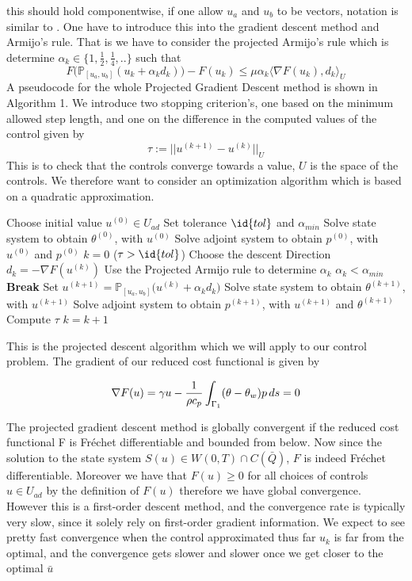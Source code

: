 this should hold componentwise, if one allow $u_a$ and $u_b$ to be vectors, notation is similar to \cite{Algorithms}. One have to introduce this into the gradient descent method and Armijo's rule. That is we have to consider the projected Armijo's rule which is determine $\alpha_k \in \{1, \frac{1}{2},\frac{1}{4},.. \}$ such that 
\begin{equation*}
    F \bigg (\mathbb{P}_{[u_a,u_b]}(u_k + \alpha_kd_k) \bigg ) - F(u_k) \leq \mu \alpha_k \langle \nabla F(u_k),d_k \rangle_{U}
\end{equation*}
A pseudocode for the whole Projected Gradient Descent method is shown in Algorithm 1. We introduce two stopping criterion's, one based on the minimum allowed step length, and one on the difference in the computed values of the control given by 
\begin{equation}
    \label{eq:stopping}
    \tau := ||u^{(k+1)} - u^{(k)}||_U 
\end{equation}
This is to check that the controls converge towards a value, $U$ is the space of the controls. We therefore want to consider an optimization algorithm which is based on a quadratic approximation. 

\begin{codebox}
\li Choose initial value $u^{(0)}\in U_{ad}$
\li Set tolerance $\id{tol}$ and $\alpha_{min}$
\li Solve state system to obtain $\theta^{(0)}$, with $u^{(0)}$
\li Solve adjoint system to obtain $p^{(0)}$, with $u^{(0)}$ and $p^{(0)}$
\li $k=0$
\li \While ($\tau > \id{tol}$)  \Then
\li Choose the descent Direction $d_k = -\nabla F(u^{(k)})$
\li Use the Projected Armijo rule to determine $\alpha_k$
\li \If $\alpha_k < \alpha_{min}$ \Then 
\li \textbf{Break} \End
\li Set $u^{(k+1)} = \mathbb{P}_{[u_a,u_b]}\bigg (u^{(k)} + \alpha_k d_k \bigg )$
\li Solve state system to obtain $\theta^{(k+1)}$, with $u^{(k+1)}$
\li Solve adjoint system to obtain $p^{(k+1)}$, with $u^{(k+1)}$ and $\theta^{(k+1)}$
\li Compute $\tau$
\li $k = k +1$
\end{codebox}
This is the projected descent algorithm which we will apply to our control problem. The gradient of our reduced cost functional is given by

\begin{equation*}
    \nabla F(u) =  \gamma u - \frac{1}{\rho c_p} \int_{\Gamma_1} (\theta - \theta_w)p \mathop{ds} = 0
\end{equation*}

The projected gradient descent method is globally convergent if the reduced cost functional F is Fréchet differentiable and bounded from below. Now since the solution to the state system $S(u) \in W(0,T) \cap C(\bar{Q})$, $F$ is indeed Fréchet differentiable. Moreover we have that $F(u) \geq 0$ for all choices of controls $u \in U_{ad}$ by the definition of $F(u)$ therefore we have global convergence. However this is a first-order descent method, and the convergence rate is typically very slow, since it solely rely on first-order gradient information. We expect to see pretty fast convergence when the control approximated thus far $u_k$ is far from the optimal, and the convergence gets slower and slower once we get closer to the optimal $\bar{u}$ 

